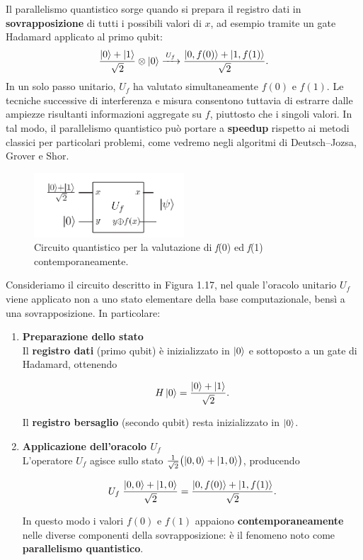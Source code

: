 \documentclass[a4paper,12pt]{report}
\theoremstyle{plain}
\begin{document}
Il parallelismo quantistico sorge quando si prepara il registro dati in \textbf{sovrapposizione} di tutti i possibili valori di $x$, ad esempio tramite un gate Hadamard applicato al primo qubit:
\[
\frac{\ket{0} + \ket{1}}{\sqrt{2}} \otimes \ket{0}
\xrightarrow{\,U_f\,}
\frac{\ket{0,f(0)} + \ket{1,f(1)}}{\sqrt{2}}.
\]
In un solo passo unitario, $U_f$ ha valutato simultaneamente $f(0)$ e $f(1)$. Le tecniche successive di interferenza e misura consentono tuttavia di estrarre dalle ampiezze risultanti informazioni aggregate su $f$, piuttosto che i singoli valori. In tal modo, il parallelismo quantistico può portare a \textbf{speedup} rispetto ai metodi classici per particolari problemi, come vedremo negli algoritmi di Deutsch--Jozsa, Grover e Shor.
\begin{figure}[H]
    \centering
    \includegraphics[width=0.5\textwidth]{Immagine16.png} 
    \caption{Circuito quantistico per la valutazione di \textit{f}(0) ed \textit{f}(1) contemporaneamente.}
    \label{Immagine16}
\end{figure}
\noindent Consideriamo il circuito descritto in Figura 1.17, nel quale l'oracolo unitario $U_f$ viene applicato non a uno stato elementare della base computazionale, bensì a una sovrapposizione. In particolare:
\begin{enumerate}
    \item \textbf{Preparazione dello stato} \\
    Il \textbf{registro dati} (primo qubit) è inizializzato in $\ket{0}$ e sottoposto a un gate di Hadamard, ottenendo
    
    \[
    H\ket{0} = \frac{\ket{0} + \ket{1}}{\sqrt{2}}.
    \]
    
    Il \textbf{registro bersaglio} (secondo qubit) resta inizializzato in $\ket{0}$.
    
    \item \textbf{Applicazione dell'oracolo $U_f$} \\
    L'operatore $U_f$ agisce sullo stato
    $\frac{1}{\sqrt{2}}\bigl(\ket{0,0} + \ket{1,0}\bigr)$,
    producendo
    
    \begin{equation}
    U_f\;\frac{\ket{0,0} + \ket{1,0}}{\sqrt{2}}
    = 
    \frac{\ket{0,f(0)} + \ket{1,f(1)}}{\sqrt{2}}.
    \end{equation}
    
    In questo modo i valori $f(0)$ e $f(1)$ appaiono \textbf{contemporaneamente} nelle diverse componenti della sovrapposizione: è il fenomeno noto come \textbf{parallelismo quantistico}.
\end{enumerate}
\end{document}
